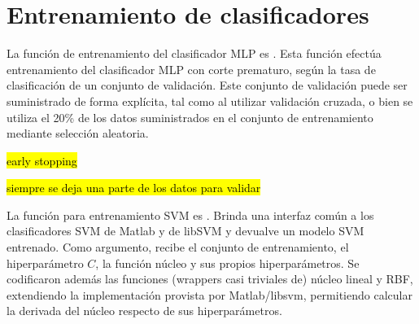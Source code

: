 \section{Entrenamiento de clasificadores}
La función de entrenamiento del clasificador MLP es
. Esta función efectúa entrenamiento del
clasificador MLP con corte prematuro, según la tasa de clasificación
de un conjunto de validación. Este conjunto de validación puede ser
suministrado de forma explícita, tal como al utilizar validación
cruzada, o bien se utiliza el 20\% de los datos suministrados en el
conjunto de entrenamiento mediante selección aleatoria.

\hl{early stopping}

\hl{siempre se deja una parte de los datos para validar}

La función para entrenamiento SVM es . Brinda una
interfaz común a los clasificadores SVM de Matlab y de libSVM y
devualve un modelo SVM entrenado.  Como argumento, recibe el conjunto
de entrenamiento, el hiperparámetro $C$, la función núcleo y sus
propios hiperparámetros.  Se codificaron además las funciones
(wrappers casi triviales de) núcleo lineal y RBF, extendiendo la
implementación provista por Matlab/libsvm, permitiendo calcular la
derivada del núcleo respecto de sus hiperparámetros.